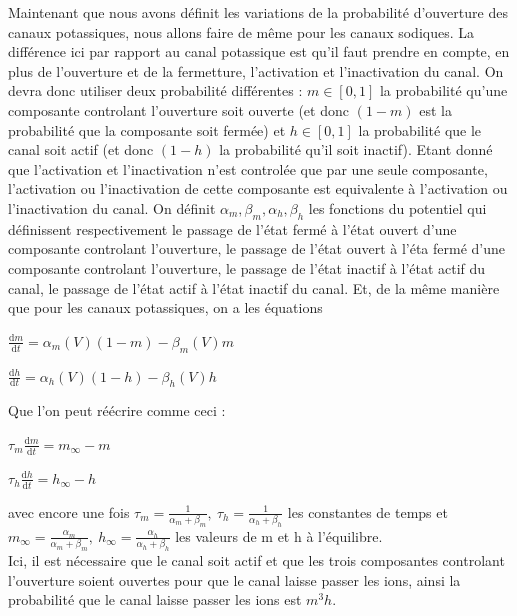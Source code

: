 \documentclass[12pt]{scrartcl}
\newcommand{\dd}{\mathrm{d}}
\begin{document}
Maintenant que nous avons définit les variations de la probabilité d'ouverture des canaux potassiques, nous allons faire de même pour les canaux sodiques. La différence ici par rapport au canal potassique est qu'il faut prendre en compte, en plus de l'ouverture et de la fermetture, l'activation et l'inactivation du canal. On devra donc utiliser deux probabilité différentes : $m \in [0,1]$ la probabilité qu'une composante controlant l'ouverture soit ouverte (et donc $(1-m)$ est la probabilité que la composante soit fermée) et $h \in [0,1]$ la probabilité que le canal soit actif (et donc $(1-h)$ la probabilité qu'il soit inactif). Etant donné que l'activation et l'inactivation n'est controlée que par une seule composante, l'activation ou l'inactivation de cette composante est equivalente à l'activation ou l'inactivation du canal. On définit $\alpha_m, \beta_m, \alpha_h, \beta_h$ les fonctions du potentiel qui définissent respectivement le passage de l'état fermé à l'état ouvert d'une composante controlant l'ouverture, le passage de l'état ouvert à l'éta fermé d'une composante controlant l'ouverture, le passage de l'état inactif à l'état actif du canal, le passage de l'état actif à l'état inactif du canal. Et, de la même manière que pour les canaux potassiques, on a les équations 
\begin{center} $\displaystyle \frac{\dd m}{\dd t} = \alpha_m(V)(1-m) - \beta_m(V) m$ \end{center}
\begin{center} $\displaystyle \frac{\dd h}{\dd t} = \alpha_h(V)(1-h) - \beta_h(V) h$ \end{center}
Que l'on peut réécrire comme ceci :
\begin{center} $\displaystyle \tau_m \frac{\dd m}{\dd t} = m_{\infty} - m$ \end{center}
\begin{center} $\displaystyle \tau_h \frac{\dd h}{\dd t} = h_{\infty} - h$ \end{center}
avec encore une fois $\tau_m = \frac{1}{\alpha_m+\beta_m},~\tau_h = \frac{1}{\alpha_h+\beta_h} $ les constantes de temps et \\$m_\infty = \frac{\alpha_m}{\alpha_m+\beta_m},~h_\infty = \frac{\alpha_h}{\alpha_h+\beta_h}$ les valeurs de m et h à l'équilibre. \\
Ici, il est nécessaire que le canal soit actif et que les trois composantes controlant l'ouverture soient ouvertes pour que le canal laisse passer les ions, ainsi la probabilité que le canal laisse passer les ions est $m^3h$.
\end{document}
